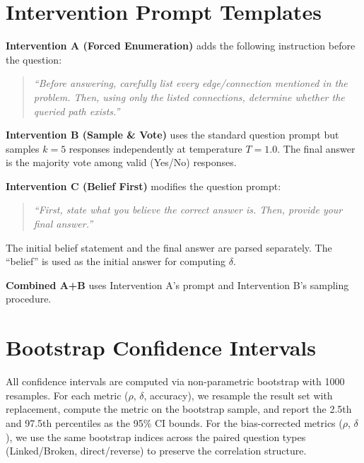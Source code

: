 \documentclass{article}
\theoremstyle{plain}
\theoremstyle{definition}
\theoremstyle{remark}
\begin{document}
\section{Intervention Prompt Templates}
\label{app:prompts}

\textbf{Intervention A (Forced Enumeration)} adds the following instruction before the question:
\begin{quote}
\emph{``Before answering, carefully list every edge/connection mentioned in the problem. Then, using only the listed connections, determine whether the queried path exists.''}
\end{quote}

\textbf{Intervention B (Sample \& Vote)} uses the standard question prompt but samples $k=5$ responses independently at temperature $T=1.0$. The final answer is the majority vote among valid (Yes/No) responses.

\textbf{Intervention C (Belief First)} modifies the question prompt:
\begin{quote}
\emph{``First, state what you believe the correct answer is. Then, provide your final answer.''}
\end{quote}
The initial belief statement and the final answer are parsed separately. The ``belief'' is used as the initial answer for computing $\delta$.

\textbf{Combined A+B} uses Intervention A's prompt and Intervention B's sampling procedure.

\section{Bootstrap Confidence Intervals}
\label{app:bootstrap}

All confidence intervals are computed via non-parametric bootstrap with 1000 resamples. For each metric ($\rho$, $\delta$, accuracy), we resample the result set with replacement, compute the metric on the bootstrap sample, and report the 2.5th and 97.5th percentiles as the 95\% CI bounds. For the bias-corrected metrics ($\rho$, $\delta$), we use the same bootstrap indices across the paired question types (Linked/Broken, direct/reverse) to preserve the correlation structure.
\end{document}

